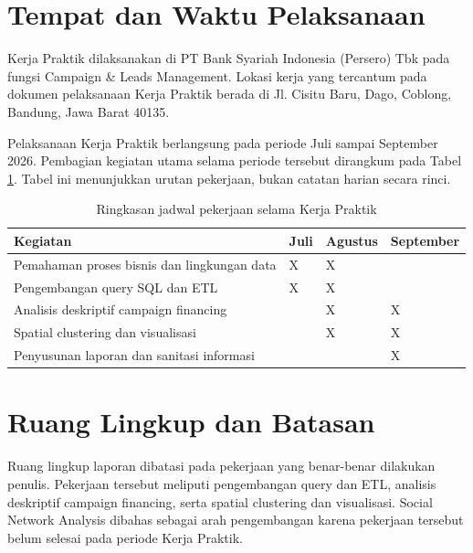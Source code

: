 \section{Tempat dan Waktu Pelaksanaan}
Kerja Praktik dilaksanakan di PT Bank Syariah Indonesia (Persero) Tbk pada fungsi Campaign \& Leads Management. Lokasi kerja yang tercantum pada dokumen pelaksanaan Kerja Praktik berada di Jl. Cisitu Baru, Dago, Coblong, Bandung, Jawa Barat 40135.

Pelaksanaan Kerja Praktik berlangsung pada periode Juli sampai September 2026. Pembagian kegiatan utama selama periode tersebut dirangkum pada Tabel \ref{tab:jadwal-kp}. Tabel ini menunjukkan urutan pekerjaan, bukan catatan harian secara rinci.

\begin{table}[htbp]
\caption{Ringkasan jadwal pekerjaan selama Kerja Praktik}
\label{tab:jadwal-kp}
\centering
\small
\setlength{\tabcolsep}{6pt}
\renewcommand{\arraystretch}{1.30}
\begin{tabularx}{0.92\textwidth}{@{}
>{\raggedright\arraybackslash}X
>{\centering\arraybackslash}p{1.35cm}
>{\centering\arraybackslash}p{1.65cm}
>{\centering\arraybackslash}p{1.85cm}
@{}}
\toprule
\textbf{Kegiatan} & \textbf{Juli} & \textbf{Agustus} & \textbf{September} \\
\midrule
Pemahaman proses bisnis dan lingkungan data & X & X & \\
\addlinespace[2pt]
Pengembangan query SQL dan ETL & X & X & \\
\addlinespace[2pt]
Analisis deskriptif campaign financing & & X & X \\
\addlinespace[2pt]
Spatial clustering dan visualisasi & & X & X \\
\addlinespace[2pt]
Penyusunan laporan dan sanitasi informasi & & & X \\
\bottomrule
\end{tabularx}
\end{table}

\section{Ruang Lingkup dan Batasan}
Ruang lingkup laporan dibatasi pada pekerjaan yang benar-benar dilakukan penulis. Pekerjaan tersebut meliputi pengembangan query dan ETL, analisis deskriptif campaign financing, serta spatial clustering dan visualisasi. Social Network Analysis dibahas sebagai arah pengembangan karena pekerjaan tersebut belum selesai pada periode Kerja Praktik.

